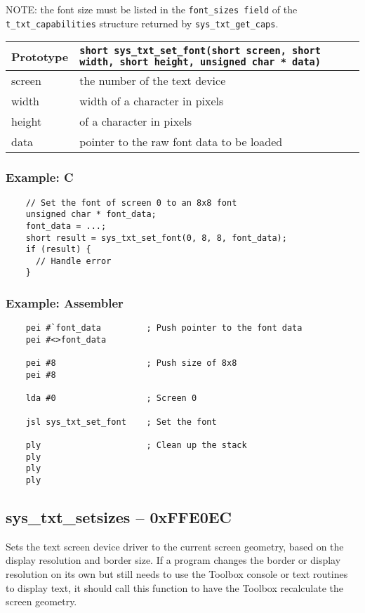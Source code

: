 NOTE: the font size must be listed in the \verb+font_sizes field+ of the \verb+t_txt_capabilities+ structure returned by \verb+sys_txt_get_caps+.

\bigskip

\begin{tabular}{|l||l|} \hline
Prototype & \lstinline!short sys_txt_set_font(short screen, short width, short height, unsigned char * data)! \\ \hline
screen & the number of the text device \\ \hline
width & width of a character in pixels \\ \hline
height & of a character in pixels \\ \hline
data & pointer to the raw font data to be loaded \\ \hline
\end{tabular}

\subsubsection*{Example: C}
\begin{lstlisting}
    // Set the font of screen 0 to an 8x8 font
    unsigned char * font_data;
    font_data = ...;
    short result = sys_txt_set_font(0, 8, 8, font_data);
    if (result) {
      // Handle error
    }    
\end{lstlisting}

\subsubsection*{Example: Assembler}
\begin{verbatim}
    pei #`font_data         ; Push pointer to the font data
    pei #<>font_data

    pei #8                  ; Push size of 8x8
    pei #8

    lda #0                  ; Screen 0

    jsl sys_txt_set_font    ; Set the font

    ply                     ; Clean up the stack
    ply
    ply
    ply
\end{verbatim}


\subsection*{sys\_txt\_setsizes -- 0xFFE0EC}
Sets the text screen device driver to the current screen geometry, based on the display resolution and border size. If a program changes the border or display resolution on its own but still needs to use the Toolbox console or text routines to display text, it should call this function to have the Toolbox recalculate the screen geometry.

